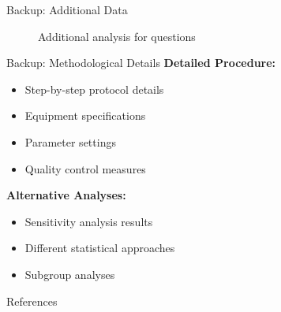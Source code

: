 \documentclass[aspectratio=169,11pt]{beamer}
\begin{document}

\appendix

\begin{frame}{Backup: Additional Data}
  \begin{figure}
    \centering
    \caption{Additional analysis for questions}
  \end{figure}
\end{frame}

\begin{frame}{Backup: Methodological Details}
  \textbf{Detailed Procedure:}
  \begin{itemize}
    \item Step-by-step protocol details
    \item Equipment specifications
    \item Parameter settings
    \item Quality control measures
  \end{itemize}
  
  \vspace{0.5cm}
  
  \textbf{Alternative Analyses:}
  \begin{itemize}
    \item Sensitivity analysis results
    \item Different statistical approaches
    \item Subgroup analyses
  \end{itemize}
\end{frame}


\begin{frame}[allowframebreaks]{References}
  \printbibliography
\end{frame}
\end{document}
